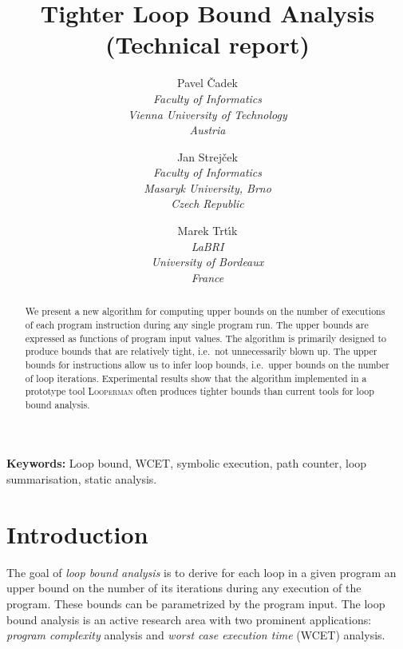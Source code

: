 \documentclass[10pt,a4paper]{article}
\newcommand{\Looperman}{\textsc{Looperman}\xspace}
\begin{document}
\title{Tighter Loop Bound Analysis\\
{\large (Technical report)}
}

\author{
 Pavel \v{C}adek\\
 \textit{Faculty of Informatics}\\
 \textit{Vienna University of Technology}\\
 \textit{Austria}
 \and
 Jan Strej\v{c}ek\\
 \textit{Faculty of Informatics}\\
 \textit{Masaryk University, Brno}\\
 \textit{Czech Republic}
 \and
 Marek Trt\'{\i}k\\
 \textit{LaBRI}\\
 \textit{University of Bordeaux}\\
 \textit{France}
}



\date{}

\maketitle




\begin{abstract}
  We present a new algorithm for computing upper bounds on the number
  of executions of each program instruction during any single program
  run. The upper bounds are expressed as functions of program input values.
  The algorithm is primarily designed to produce bounds
  that are relatively tight, i.e.~not unnecessarily blown up. The upper bounds for instructions allow us to infer loop bounds,
  i.e.~upper bounds on the number of loop iterations. Experimental
  results show that the algorithm implemented in a prototype tool
  \Looperman often produces tighter bounds than current tools for loop
  bound analysis.
\end{abstract}

\textbf{Keywords: }Loop bound, WCET, symbolic execution, path counter, loop
summarisation, static analysis.





\section{Introduction}\label{sec:intro}



The goal of \emph{loop bound analysis} is to derive for each loop in a given
program an upper bound on the number of its iterations during any execution
of the program. These bounds can be parametrized by the program input. The
loop bound analysis is an active research area with two prominent
applications: \emph{program complexity} analysis and \emph{worst case
  execution time} (WCET) analysis.
\end{document}
